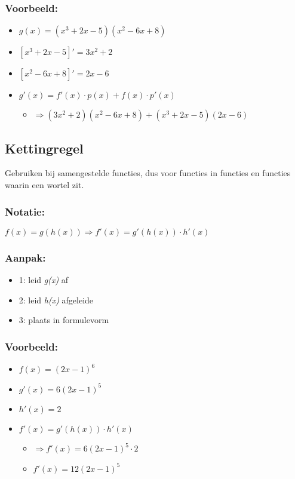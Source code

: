 \documentclass[11pt]{article}
\begin{document}
\subsubsection{Voorbeeld:}
\label{sec:org348fdbf}
\begin{itemize}
\item \(g(x) = (x^{3}+2x-5)(x^{2}-6x+8)\)
\item \([x^{3}+2x-5]' = 3x^{2}+2\)
\item \([x^{2}-6x+8]' = 2x-6\)
\item \(g'(x) = f'(x) \cdot p(x) + f(x) \cdot p'(x)\)
\begin{itemize}
\item \(\Rightarrow  (3x^{2}+2)(x^{2}-6x+8) + (x^{3}+2x-5)(2x-6)\)
\end{itemize}
\end{itemize}



\subsection{Kettingregel}
\label{sec:org653aacd}
Gebruiken bij samengestelde functies, dus voor functies in functies en functies waarin een wortel zit.
\subsubsection{Notatie:}
\label{sec:orgab1823a}
\(f(x) = g(h(x)) \Rightarrow f'(x) = g'(h(x)) \cdot h'(x)\)
\subsubsection{Aanpak:}
\label{sec:orgfa5c059}
\begin{itemize}
\item 1: leid \textit{g(x)} af
\item 2: leid \textit{h(x)} afgeleide
\item 3: plaats in formulevorm
\end{itemize}
\subsubsection{Voorbeeld:}
\label{sec:org478b49f}
\begin{itemize}
\item \(f(x) = (2x-1)^{6}\)
\item \(g'(x) = 6(2x-1)^{5}\)
\item \(h'(x) = 2\)
\item \(f'(x) = g'(h(x)) \cdot h'(x)\)
\begin{itemize}
\item \(\Rightarrow f'(x) = 6(2x-1)^5 \cdot 2\)
\item \(f'(x) = 12(2x-1)^5\)
\end{itemize}
\end{itemize}
\end{document}
